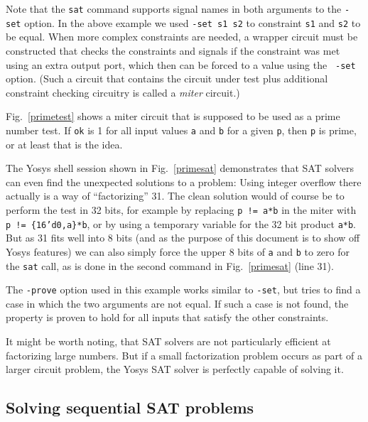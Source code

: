 \documentclass[9pt,technote,a4paper]{IEEEtran}
\begin{document}
Note that the {\tt sat} command supports signal names in both arguments
to the {\tt -set} option. In the above example we used {\tt -set s1 s2}
to constraint {\tt s1} and {\tt s2} to be equal. When more complex
constraints are needed, a wrapper circuit must be constructed that
checks the constraints and signals if the constraint was met using an
extra output port, which then can be forced to a value using the {\tt
-set} option. (Such a circuit that contains the circuit under test
plus additional constraint checking circuitry is called a {\it miter\/}
circuit.)

Fig.~\ref{primetest} shows a miter circuit that is supposed to be used as a
prime number test. If {\tt ok} is 1 for all input values {\tt a} and {\tt b}
for a given {\tt p}, then {\tt p} is prime, or at least that is the idea.

The Yosys shell session shown in Fig.~\ref{primesat} demonstrates that SAT
solvers can even find the unexpected solutions to a problem: Using integer
overflow there actually is a way of ``factorizing'' 31. The clean solution
would of course be to perform the test in 32 bits, for example by replacing
{\tt p != a*b} in the miter with {\tt p != \{16'd0,a\}*b}, or by using a
temporary variable for the 32 bit product {\tt a*b}. But as 31 fits well into
8 bits (and as the purpose of this document is to show off Yosys features)
we can also simply force the upper 8 bits of {\tt a} and {\tt b} to zero for
the {\tt sat} call, as is done in the second command in Fig.~\ref{primesat}
(line 31).

The {\tt -prove} option used in this example works similar to {\tt -set}, but
tries to find a case in which the two arguments are not equal. If such a case is
not found, the property is proven to hold for all inputs that satisfy the other
constraints.

It might be worth noting, that SAT solvers are not particularly efficient at
factorizing large numbers. But if a small factorization problem occurs as
part of a larger circuit problem, the Yosys SAT solver is perfectly capable
of solving it.

\subsection{Solving sequential SAT problems}
\end{document}
